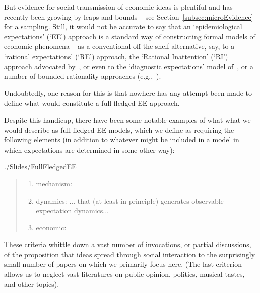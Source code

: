 But evidence for social transmission of economic ideas is plentiful and has recently been growing by leaps and bounds -- see Section~\ref{subsec:microEvidence} for a sampling.  Still, it would not be accurate to say that an `epidemiological expectations' (`EE') approach is a standard way of constructing formal models of economic phenomena -- as a conventional off-the-shelf alternative, say, to a `rational expectations' (`RE') approach, the `Rational Inattention' (`RI') approach advocated by~\cite{sims2003implications}, or even to the `diagnostic expectations' model of~\cite{bordalo2018diagnostic}, or a number of bounded rationality approaches (e.g.,~\cite{gabaix2020behavioral}).

Undoubtedly, one reason for this is that nowhere has any attempt been made to define what would constitute a full-fledged EE approach.

Despite this handicap, there have been some notable examples of what what we would describe as full-fledged EE models, which we define as requiring the following elements (in addition to whatever might be included in a model in which expectations are determined in some other way):
\begin{verbatimwrite}{./Slides/FullFledgedEE}
\begin{quote}\normalfont
\begin{enumerate}
\item mechanism: 
\item dynamics: 
{... that (at least in principle) generates observable expectation dynamics...}
\item economic: 
  \end{enumerate}
\end{quote}
\end{verbatimwrite}

  These criteria whittle down a vast number of invocations, or partial discussions, of the proposition that ideas spread through social interaction to the surprisingly small number of papers on which we primarily focus here.  (The last criterion allows us to neglect vast literatures on public opinion, politics, musical tastes, and other topics).

